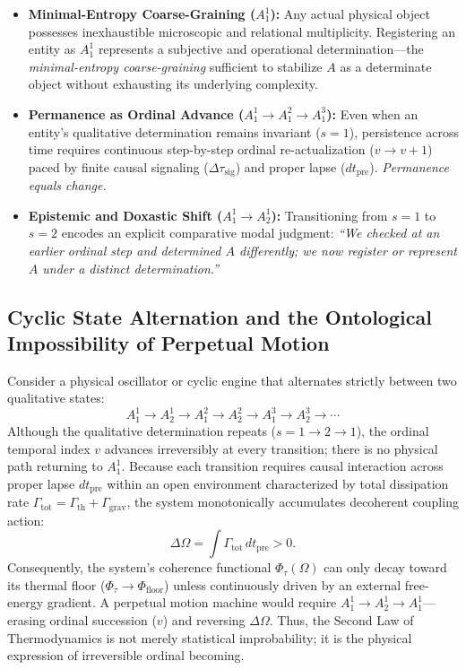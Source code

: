 \documentclass[11pt,a4paper]{article}
\begin{document}
\begin{itemize}
    \item \textbf{Minimal-Entropy Coarse-Graining ($A_1^1$):} Any actual physical object possesses inexhaustible microscopic and relational multiplicity. Registering an entity as $A_1^1$ represents a subjective and operational determination—the \emph{minimal-entropy coarse-graining} sufficient to stabilize $A$ as a determinate object without exhausting its underlying complexity.
    \item \textbf{Permanence as Ordinal Advance ($A_1^1 \to A_1^2 \to A_1^3$):} Even when an entity's qualitative determination remains invariant ($s = 1$), persistence across time requires continuous step-by-step ordinal re-actualization ($v \to v+1$) paced by finite causal signaling ($\Delta\tau_{\mathrm{sig}}$) and proper lapse ($dt_{\mathrm{pre}}$). \emph{Permanence equals change.}
    \item \textbf{Epistemic and Doxastic Shift ($A_1^1 \to A_2^1$):} Transitioning from $s = 1$ to $s = 2$ encodes an explicit comparative modal judgment: \emph{``We checked at an earlier ordinal step and determined $A$ differently; we now register or represent $A$ under a distinct determination.''}
\end{itemize}

\subsection{Cyclic State Alternation and the Ontological Impossibility of Perpetual Motion}

Consider a physical oscillator or cyclic engine that alternates strictly between two qualitative states:
\begin{equation}
    A_1^1 \longrightarrow A_2^1 \longrightarrow A_1^2 \longrightarrow A_2^2 \longrightarrow A_1^3 \longrightarrow A_2^3 \longrightarrow \cdots
\end{equation}
Although the qualitative determination repeats ($s = 1 \to 2 \to 1$), the ordinal temporal index $v$ advances irreversibly at every transition; there is no physical path returning to $A_1^1$. Because each transition requires causal interaction across proper lapse $dt_{\mathrm{pre}}$ within an open environment characterized by total dissipation rate $\Gamma_{\mathrm{tot}} = \Gamma_{\mathrm{th}} + \Gamma_{\mathrm{grav}}$, the system monotonically accumulates decoherent coupling action:
\begin{equation}
    \Delta\Omega = \int \Gamma_{\mathrm{tot}}\,dt_{\mathrm{pre}} > 0.
\end{equation}
Consequently, the system's coherence functional $\Phi_\tau(\Omega)$ can only decay toward its thermal floor ($\Phi_\tau \to \Phi_{\mathrm{floor}}$) unless continuously driven by an external free-energy gradient. A perpetual motion machine would require $A_1^1 \to A_2^1 \to A_1^1$—erasing ordinal succession ($v$) and reversing $\Delta\Omega$. Thus, the Second Law of Thermodynamics is not merely statistical improbability; it is the physical expression of irreversible ordinal becoming.
\end{document}
